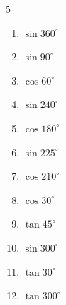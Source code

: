 \begin{multicols}{5}
\begin{enumerate}
        \phantom{$\displaystyle =0$}

  \item $\displaystyle \sin{360^\circ}$

        \phantom{$\displaystyle =0$}

  \item $\displaystyle \sin{90^\circ}$

        \phantom{$\displaystyle =1$}

  \item $\displaystyle \cos{60^\circ}$


  \item $\displaystyle \sin{240^\circ}$


  \item $\displaystyle \cos{180^\circ}$

        \phantom{$\displaystyle =-1$}

  \item $\displaystyle \sin{225^\circ}$


  \item $\displaystyle \cos{210^\circ}$


  \item $\displaystyle \cos{30^\circ}$


  \item $\displaystyle \tan{45^\circ}$

        \phantom{$\displaystyle =1$}

  \item $\displaystyle \sin{300^\circ}$


  \item $\displaystyle \tan{30^\circ}$


\columnbreak %

  \item $\displaystyle \tan{300^\circ}$



\end{enumerate}
\end{multicols}
